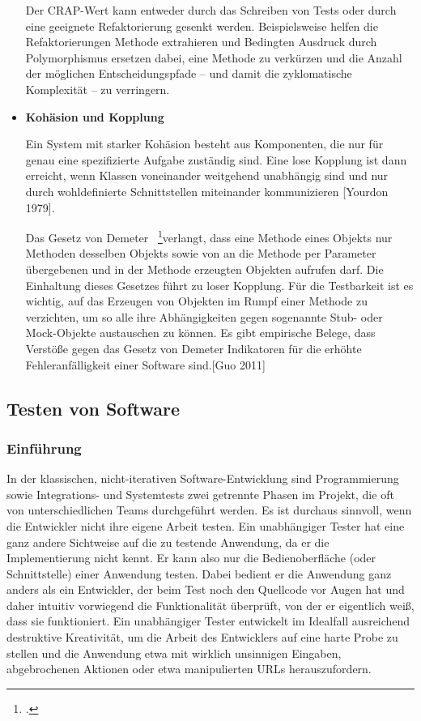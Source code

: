 \begin{itemize}
    Der CRAP-Wert kann entweder durch das Schreiben von Tests oder durch eine geeignete Refaktorierung gesenkt werden. Beispielsweise helfen die Refaktorierungen Methode extrahieren und Bedingten Ausdruck durch Polymorphismus ersetzen dabei, eine Methode zu verkürzen und die Anzahl der möglichen Entscheidungspfade – und damit die zyklomatische Komplexität – zu verringern.
    
    \item \textbf{Kohäsion und Kopplung}
    
    Ein System mit starker Kohäsion besteht aus Komponenten, die nur für genau eine spezifizierte Aufgabe zuständig sind. Eine lose Kopplung ist dann erreicht, wenn Klassen voneinander weitgehend unabhängig sind und nur durch wohldefinierte Schnittstellen miteinander kommunizieren [Yourdon 1979].
    
    Das Gesetz von Demeter ~\footcite[Vgl. Seite 67-78]{Lieberherr.1989}verlangt, dass eine Methode eines Objekts nur Methoden desselben 
    Objekts sowie von an die Methode per Parameter übergebenen und in der Methode erzeugten Objekten aufrufen darf. Die Einhaltung dieses Gesetzes führt zu loser Kopplung. Für die Testbarkeit ist es wichtig, auf das Erzeugen von Objekten im Rumpf einer Methode zu verzichten, um so alle ihre Abhängigkeiten gegen sogenannte Stub- oder Mock-Objekte austauschen zu können. Es gibt empirische Belege, dass Verstöße gegen das Gesetz von Demeter Indikatoren für die erhöhte Fehleranfälligkeit einer Software sind.[Guo 2011]
    
\end{itemize}

\subsection{Testen von Software}\label{arten-von-tests} 
\subsubsection{Einführung} %
In der klassischen, nicht-iterativen Software-Entwicklung sind Programmierung sowie
Integrations- und Systemtests zwei getrennte Phasen im Projekt, die oft von unterschiedlichen
Teams durchgeführt werden. Es ist durchaus sinnvoll, wenn die Entwickler nicht
ihre eigene Arbeit testen. Ein unabhängiger Tester hat eine ganz andere Sichtweise auf
die zu testende Anwendung, da er die Implementierung nicht kennt. Er kann also nur
die Bedienoberfläche (oder Schnittstelle) einer Anwendung testen. Dabei bedient er die
Anwendung ganz anders als ein Entwickler, der beim Test noch den Quellcode vor Augen hat
und daher intuitiv vorwiegend die Funktionalität überprüft, von der er eigentlich weiß,
dass sie funktioniert. Ein unabhängiger Tester entwickelt im Idealfall ausreichend destruktive Kreativität, um die Arbeit des Entwicklers auf eine harte Probe zu stellen und die Anwendung etwa mit wirklich unsinnigen Eingaben, abgebrochenen Aktionen oder etwa manipulierten URLs herauszufordern.

